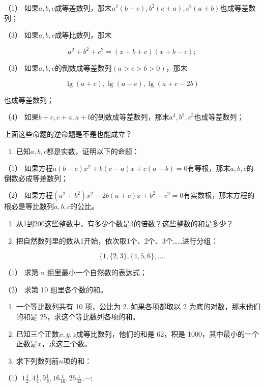 （1）
如果\(a, b, c\)成等差数列，那末\(a^2(b + c), b^2(c + a), c^2(a + b)\)也成等差数列；

（3） 如果\(a, b, c\)成等比数列，那末

\[
a^{2} + b^{2} + c^{2} = (x + b + c) (x + b - c);
\]

（3） 如果\(a, b, c\)的倒数成等差数列\((a > c > b > 0)\)，那末

\[
\lg (a + c), \lg (a - c), \lg (a + c - 2 b)
\]

也成等差数列；

（4）
如果\(b + c, c + a, a + b\)的到数成等差数列，那末\(a^3, b^3, c^3\)也成等差数列；

上面这些命题的逆命题是不是也能成立？

\begin{enumerate}[start=2]
\item
  已知\(a, b, c\)都是实数，证明以下的命题：
\end{enumerate}

（1）
如果方程\(a(b - c)x^2 + b(c - a)x + c(a - b) = 0\)有等根，那末\(a, b, c\)的倒数必成等差数列；

（2）
如果方程\((a^2 + b^2)x^2 - 2b(a + c)x + b^2 + c^2 = 0\)有实数根，那末方程的根必是等比数列\(a, b, c\)的公比。

\begin{enumerate}[start=3]
\item
  从1到200这些整数中，有多少个数是3的倍数？这些整数的和是多少？
\item
  把自然数列里的数从1开始，依次取1个、2个、3个\ldots\ldots 进行分组：
\end{enumerate}

\[
\{1, \{2, 3 \}, \{4, 5, 6 \}, \dots.
\]

（1） 求第 n 组里最小一个自然数的表达式；

（2） 求第 10 组里各个数的和。

\begin{enumerate}[start=5]
\item
  一个等比数列共有 10 项，公比为 2. 如果各项都取以 2
  为底的对数，那末他们的和是 25，求这个等比数列各项的和。
\item
  已知三个正数\(x, y, z\)成等比数列，他们的和是 62，积是
  1000，其中最小的一个正数是\(x\)，求这三个数。
\item
  求下列数列前\(n\)项的和：
\end{enumerate}

（1）\(1\frac{1}{2}, 4\frac{1}{4}, 9\frac{1}{8}, 16\frac{1}{16}, 25\frac{1}{32}, \cdots;\)

